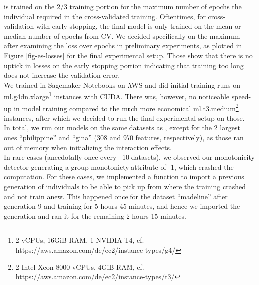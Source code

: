 \documentclass[twoside,11pt]{article}
\begin{document}
is trained on the 2/3 training portion for the maximum number of epochs the individual required in the cross-validated training.
Oftentimes, for cross-validation with early stopping, the final model is only trained on the mean or median number of epochs from CV.
We decided specifically on the maximum after examining the loss over epochs in preliminary experiments, as plotted in Figure \ref{fig-es-losses}
for the final experimental setup. Those show that there is no uptick in losses on the early stopping portion indicating that training too long does not increase
the validation error.
\\
We trained in Sagemaker Notebooks on AWS and did initial training runs on
ml.g4dn.xlarge\footnote{2 vCPUs, 16GiB RAM, 1 NVIDIA T4, cf. https://aws.amazon.com/de/ec2/instance-types/g4/} instances with CUDA.
There was, however, no noticeable speed-up in model training compared to the much more economical
ml.t3.medium\footnote{2 Intel Xeon 8000 vCPUs, 4GiB RAM, cf. https://aws.amazon.com/de/ec2/instance-types/t3/} instances, after which we decided to run the
final experimental setup on those.
\\
In total, we run our models on the same datasets as \citet[p. 544]{EAGGA}, except for the 2 largest ones ``philippine'' and ``gina'' (308 and 970 features, respectively),
as those ran out of memory when initializing the interaction effects.
\\
In rare cases (anecdotally once every ~10 datasets), we observed our monotonicity detector generating a group monotonicty attribute of -1, which crashed the computation.
For these cases, we implemented a function to import a previous generation of individuals to be able to pick up from where the training crashed and not train anew.
This happened once for the dataset ``madeline'' after generation 9 and training for 5 hours 45 minutes, and hence we imported the generation and ran it for the remaining
2 hours 15 minutes.
\end{document}
